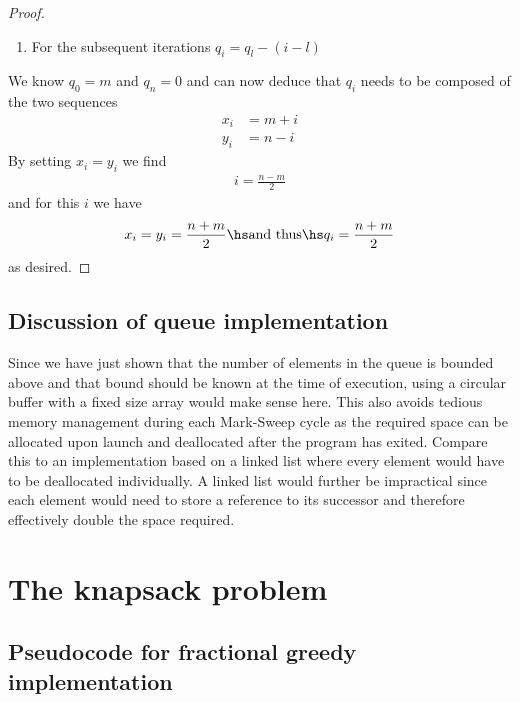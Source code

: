 \documentclass{article}
\begin{document}
\begin{proof}
\begin{enumerate}
        \item For the subsequent iterations $q_i = q_l - (i - l)$
    \end{enumerate}
    We know $q_0 = m$ and $q_n=0$ and can now deduce that $q_i$ needs to be composed of
    the two sequences
    \begin{align*}
        x_i &= m + i\\
        y_i &= n - i
    \end{align*}
    By setting $x_i=y_i$ we find
    \begin{align*}
        i = \frac{n-m}{2}
    \end{align*} 
    and for this $i$ we have
    \begin{align*}
        x_i = y_i = \frac{n+m}{2}\hs\text{and thus}\hs q_i = \frac{n+m}{2}
    \end{align*}
    as desired.
    

\end{proof}

\subsection{Discussion of queue implementation}

Since we have just shown that the number of elements in the queue is bounded
above and that bound should be known at the time of execution, using a
circular buffer with a fixed size array would make sense here. This also avoids 
tedious memory management during each Mark-Sweep cycle as the required
space can be allocated upon launch and deallocated after the program has exited.
Compare this to an implementation based on a linked list where every element would
have to be deallocated individually. A linked list would further be impractical
since each element would need to store a reference to its successor and therefore
effectively double the space required.


\section{The knapsack problem}


\subsection{Pseudocode for fractional greedy implementation}
\end{document}
